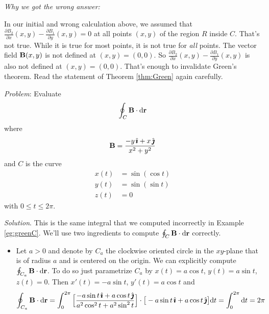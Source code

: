 \begin{eg}
\medskip
\noindent
\emph{Why we got the wrong answer:}

\noindent
In our initial and wrong calculation above, we assumed that 
$\frac{\partial B_2}{\partial x}(x,y) 
                - \frac{\partial B_1}{\partial y}(x,y)=0$
at all points $(x,y)$ of the region $R$ inside $C$. That's not true.
While it is true for most points, it is not true for  \emph{all} points.
The vector field $\mathbf{B}(x,y)$ is not defined at $(x,y)=(0,0)$.
So $\frac{\partial B_2}{\partial x}(x,y) 
                - \frac{\partial B_1}{\partial y}(x,y)$
is also not defined at $(x,y)=(0,0)$. That's enough to invalidate
Green's theorem. Read the statement of Theorem \ref{thm:Green} again carefully.

\end{eg}

\begin{eg}\label{eg:greenCC}
\noindent\textit{Problem}:
Evaluate
\begin{equation*}
\oint_C\mathbf{B}\cdot\mathrm{d}\mathbf{r}
\end{equation*}
where
\begin{equation*}
\mathbf{B} = \frac{-y\,\hat{\pmb{\imath}}+x\,\hat{\pmb{\jmath}}}{x^2+y^2}
\end{equation*}
and $C$ is the curve
\begin{align*}
x(t) &= \sin(\cos t) \\
y(t) &= \sin(\sin t) \\
z(t) &= 0
\end{align*}
with $0\le t\le 2\pi$.

\medskip
\noindent\textit{Solution}.
This is the same integral that we computed incorrectly in Example
 \ref{eg:greenC}.
We'll use two ingredients to compute $\oint_C\mathbf{B}\cdot\mathrm{d}\mathbf{r}$
correctly.

\begin{itemize}\itemsep1pt \parskip0pt  %
\item
Let $a>0$ and denote by $C_a$ the clockwise oriented circle in 
the $xy$-plane that is of radius $a$ and is centered on the origin. 
We can explicitly compute
$\oint_{C_a}\mathbf{B}\cdot\mathrm{d}\mathbf{r}$. To do so just parametrize 
$C_a$ by $x(t)=a\cos t$, $y(t) = a\sin t$, $z(t)=0$. Then
$x'(t)=-a\sin t$, $y'(t) = a\cos t$ and
\begin{align*}
\oint_{C_a}\mathbf{B}\cdot\mathrm{d}\mathbf{r}
&=\int_0^{2\pi}\Big[\frac{-a\sin t\,\hat{\pmb{\imath}}+a\cos t\,\hat{\pmb{\jmath}}}
                            {a^2\cos^2t+a^2\sin^2t}\Big]
           \cdot\big[-a\sin t\,\hat{\pmb{\imath}}+a\cos t\,\hat{\pmb{\jmath}}\big]
           \mathrm{d}t
=\int_0^{2\pi}\mathrm{d}t=2\pi
\end{align*}


\end{itemize}
\end{eg}
